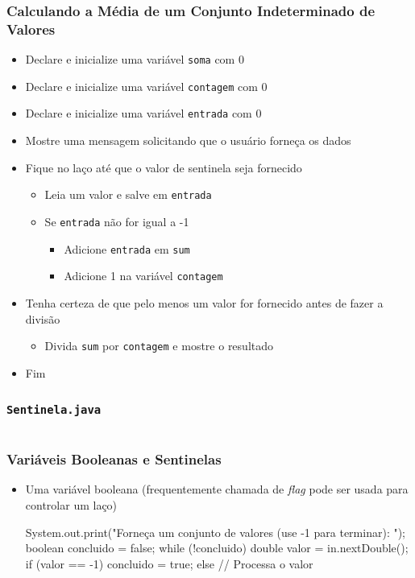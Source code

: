 \documentclass[xcolor={dvipsnames,table},aspectratio=169]{beamer}
\begin{document}
\begin{frame}\frametitle{Calculando a Média de um Conjunto Indeterminado de Valores}
\begin{itemize}
	\item Declare e inicialize uma variável \texttt{soma} com 0
	\item Declare e inicialize uma variável \texttt{contagem} com 0
	\item Declare e inicialize uma variável \texttt{entrada} com 0
	\item Mostre uma mensagem solicitando que o usuário forneça os dados
	\item Fique no laço até que o valor de sentinela seja fornecido
	\begin{itemize}
		\item Leia um valor e salve em \texttt{entrada}
		\item Se \texttt{entrada} não for igual a -1
		\begin{itemize}
			\item Adicione \texttt{entrada} em \texttt{sum}
			\item Adicione 1 na variável \texttt{contagem}
		\end{itemize}
	\end{itemize}
	\item Tenha certeza de que pelo menos um valor for fornecido antes de fazer a divisão
	\begin{itemize}
		\item Divida \texttt{sum} por \texttt{contagem} e mostre o resultado
	\end{itemize}
	\item Fim	
\end{itemize}
\end{frame}

\begin{frame}[fragile]\frametitle{\texttt{Sentinela.java}}
\tiny{\inputminted[bgcolor=cyan!10]{java}{src/Sentinela.java}}
\end{frame}

\begin{frame}[fragile]\frametitle{Variáveis Booleanas e Sentinelas}
\begin{itemize}
	\item Uma variável booleana (frequentemente chamada de \emph{flag} pode ser usada para controlar um laço)
\begin{javacode}
System.out.print("Forneça um conjunto de valores (use -1 para terminar): ");
boolean concluido = false;
while (!concluido) {
   double valor = in.nextDouble();
   if (valor == -1) {
      concluido = true;
   }
   else {
      // Processa o valor
   }
}
\end{javacode}
\end{itemize}
\end{frame}
\end{document}
